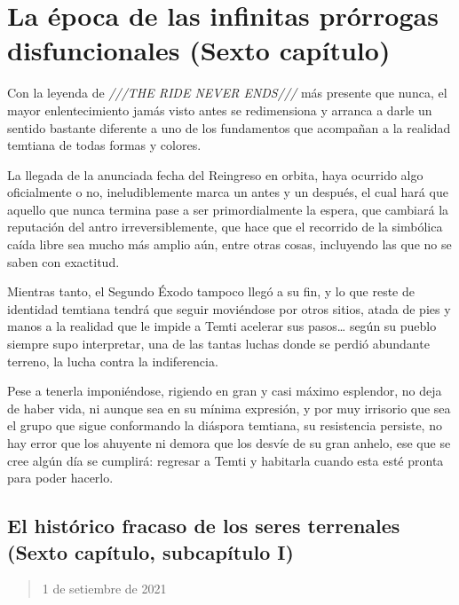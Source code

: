 \documentclass[
  spanish,
]{book}
\begin{document}
\hypertarget{la-uxe9poca-de-las-infinitas-pruxf3rrogas-disfuncionales-sexto-capuxedtulo}{%
\chapter{La época de las infinitas prórrogas disfuncionales (Sexto capítulo)}\label{la-uxe9poca-de-las-infinitas-pruxf3rrogas-disfuncionales-sexto-capuxedtulo}}

Con la leyenda de \emph{///THE RIDE NEVER ENDS///} más presente que nunca, el mayor enlentecimiento jamás visto antes se redimensiona y arranca a darle un sentido bastante diferente a uno de los fundamentos que acompañan a la realidad temtiana de todas formas y colores.

La llegada de la anunciada fecha del Reingreso en orbita, haya ocurrido algo oficialmente o no, ineludiblemente marca un antes y un después, el cual hará que aquello que nunca termina pase a ser primordialmente la espera, que cambiará la reputación del antro irreversiblemente, que hace que el recorrido de la simbólica caída libre sea mucho más amplio aún, entre otras cosas, incluyendo las que no se saben con exactitud.

Mientras tanto, el Segundo Éxodo tampoco llegó a su fin, y lo que reste de identidad temtiana tendrá que seguir moviéndose por otros sitios, atada de pies y manos a la realidad que le impide a Temti acelerar sus pasos\ldots{} según su pueblo siempre supo interpretar, una de las tantas luchas donde se perdió abundante terreno, la lucha contra la indiferencia.

Pese a tenerla imponiéndose, rigiendo en gran y casi máximo esplendor, no deja de haber vida, ni aunque sea en su mínima expresión, y por muy irrisorio que sea el grupo que sigue conformando la diáspora temtiana, su resistencia persiste, no hay error que los ahuyente ni demora que los desvíe de su gran anhelo, ese que se cree algún día se cumplirá: regresar a Temti y habitarla cuando esta esté pronta para poder hacerlo.

\hypertarget{el-histuxf3rico-fracaso-de-los-seres-terrenales-sexto-capuxedtulo-subcapuxedtulo-i}{%
\section{El histórico fracaso de los seres terrenales (Sexto capítulo, subcapítulo I)}\label{el-histuxf3rico-fracaso-de-los-seres-terrenales-sexto-capuxedtulo-subcapuxedtulo-i}}

\begin{quote}
1 de setiembre de 2021
\end{quote}
\end{document}
